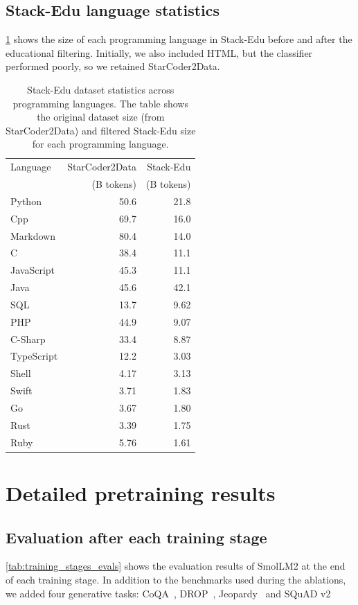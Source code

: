 \documentclass{article}
\theoremstyle{plain}
\theoremstyle{definition}
\theoremstyle{remark}
\begin{document}
\subsection{Stack-Edu language statistics}\label{app:stack-edu-stats}
\cref{tab:stack-edu-all-stats} shows the size of each programming language in Stack-Edu before and after the educational filtering. Initially, we also included HTML, but the classifier performed poorly, so we retained StarCoder2Data.
\begin{table}[h]
\caption{Stack-Edu dataset statistics across programming languages. The table shows the original dataset size (from StarCoder2Data) and filtered Stack-Edu size for each programming language.}
\label{tab:stack-edu-all-stats}
\centering
\small
\begin{tabular}{@{}lrr@{}}
\toprule
Language & StarCoder2Data & Stack-Edu \\
& (B tokens) & (B tokens) \\
\midrule
Python & 50.6 & 21.8 \\
Cpp & 69.7 & 16.0 \\
Markdown & 80.4 & 14.0 \\
C & 38.4 & 11.1 \\
JavaScript & 45.3 & 11.1 \\
Java & 45.6 & 42.1  \\
SQL & 13.7 & 9.62 \\
PHP & 44.9 & 9.07 \\
C-Sharp & 33.4 & 8.87 \\
TypeScript & 12.2 & 3.03 \\
Shell & 4.17 & 3.13 \\
Swift & 3.71 & 1.83 \\
Go & 3.67 & 1.80 \\
Rust & 3.39 & 1.75 \\
Ruby & 5.76 & 1.61 \\
\bottomrule
\end{tabular}
\end{table}

\clearpage
\section{Detailed pretraining results}
\subsection{Evaluation after each training stage}
\cref{tab:training_stages_evals} shows the evaluation results of SmolLM2 at the end of each training stage. In addition to the benchmarks used during the ablations, we added four generative tasks: CoQA~\cite{reddy2019coqa}, DROP~\cite{dua2019drop}, Jeopardy~\cite{mosaicml_jeopardy} and SQuAD v2~\cite{rajpurkar2018know}
\label{app:evals_stages_full}
\end{document}
